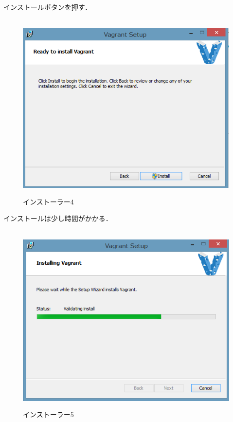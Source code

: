 インストールボタンを押す．
\begin{figure}[htbp]
\centering　
\includegraphics[width=13cm]{vagrant6.png}
\caption{インストーラー4}
\end{figure}

インストールは少し時間がかかる．
\begin{figure}[htbp]
\centering　
\includegraphics[width=13cm]{vagrant7.png}
\caption{インストーラー5}
\end{figure}

